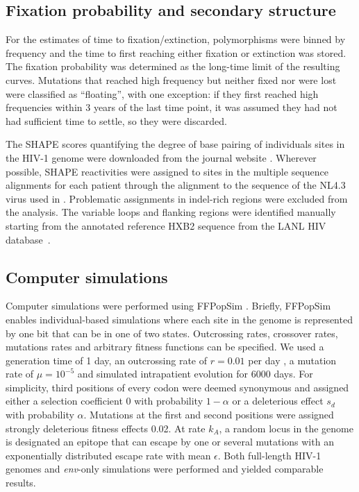 \documentclass[rmp, twocolumn]{revtex4}
\newcommand{\env}{\textit{env}}
\begin{document}
\subsection{Fixation probability and secondary structure}
For the estimates of time to fixation/extinction, polymorphisms were binned by
frequency and the time to first reaching either fixation or extinction was
stored. The fixation probability was determined as the long-time limit of the
resulting curves. Mutations that reached high frequency but neither fixed nor
were lost were classified as ``floating'', with one exception: if they first
reached high frequencies within 3 years of the last time point, it was assumed
they had not had sufficient time to settle, so they were discarded.

The SHAPE scores quantifying the degree of base pairing of individuals sites in
the HIV-1 genome were downloaded from the journal website
\citep{watts_architecture_2009}. Wherever possible, SHAPE reactivities were
assigned to sites in the multiple sequence alignments for each patient through
the alignment to the sequence of the NL4.3 virus used in
\citep{watts_architecture_2009}. Problematic assignments in indel-rich
regions were excluded from the analysis. The variable loops and flanking
regions were identified manually starting from the annotated reference HXB2
sequence from the LANL HIV database~\citep{LANL2012}. 

\subsection{Computer simulations}
Computer simulations were performed using FFPopSim
\citep{zanini_ffpopsim:_2012}. Briefly, FFPopSim enables individual-based
simulations where each site in the genome is represented by one bit that can be
in one of two states. Outcrossing rates, crossover rates, mutations rates and
arbitrary fitness functions can be specified. We used a generation time of 1
day, an outcrossing rate of $r=0.01$ per day \citep{batorsky_estimate_2011,
neher_recombination_2010}, a mutation rate of $\mu=10^{-5}$
\citep{mansky_lower_1995, abram_nature_2010} and simulated intrapatient
evolution for 6000 days. For simplicity, third positions of every codon were
deemed synonymous and assigned either a selection coefficient $0$ with
probability $1-\alpha$ or a deleterious effect $s_d$ with probability $\alpha$.
Mutations at the first and second positions were assigned strongly deleterious 
fitness effects 0.02. At 
rate $k_A$, a random locus in the genome is designated an epitope that can
escape by one or several mutations with an exponentially distributed escape rate
with mean $\epsilon$. Both full-length HIV-1 genomes and \env{}-only simulations
were performed and yielded comparable results.
\end{document}
